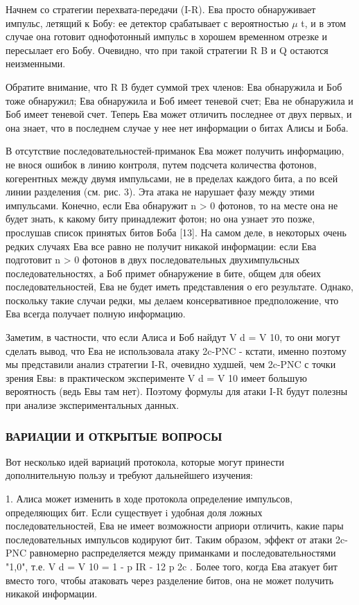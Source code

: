 Начнем со стратегии перехвата-передачи (I-R). Ева просто обнаруживает импульс, летящий к Бобу: ее детектор срабатывает с вероятностью $\mu$ t, и в этом случае она готовит однофотонный импульс в хорошем временном отрезке и пересылает его Бобу. Очевидно, что при такой стратегии R B и Q остаются неизменными.

Обратите внимание, что R B будет суммой трех членов: Ева обнаружила и Боб тоже обнаружил; Ева обнаружила и Боб имеет теневой счет; Ева не обнаружила и Боб имеет теневой счет. Теперь Ева может отличить последнее от двух первых, и она знает, что в последнем случае у нее нет информации о битах Алисы и Боба.

В отсутствие последовательностей-приманок Ева может получить информацию, не внося ошибок в линию контроля, путем подсчета количества фотонов, когерентных между двумя импульсами, не в пределах каждого бита, а по всей линии разделения (см. рис. 3). Эта атака не нарушает фазу между этими импульсами. Конечно, если Ева обнаружит n > 0 фотонов, то на месте она не будет знать, к какому биту принадлежит фотон; но она узнает это позже, прослушав список принятых битов Боба [13]. На самом деле, в некоторых очень редких случаях Ева все равно не получит никакой информации: если Ева подготовит n > 0 фотонов в двух последовательных двухимпульсных последовательностях, а Боб примет обнаружение в бите, общем для обеих последовательностей, Ева не будет иметь представления о его результате. Однако, поскольку такие случаи редки, мы делаем консервативное предположение, что Ева всегда получает полную информацию.

Заметим, в частности, что если Алиса и Боб найдут V d = V 10, то они могут сделать вывод, что Ева не использовала атаку 2c-PNC - кстати, именно поэтому мы представили анализ стратегии I-R, очевидно худшей, чем 2c-PNC с точки зрения Евы: в практическом эксперименте V d = V 10 имеет большую вероятность (ведь Евы там нет). Поэтому формулы для атаки I-R будут полезны при анализе экспериментальных данных.

\subsubsection{ВАРИАЦИИ И ОТКРЫТЫЕ ВОПРОСЫ}

Вот несколько идей вариаций протокола, которые могут принести дополнительную пользу и требуют дальнейшего изучения:

1. Алиса может изменить в ходе протокола определение импульсов, определяющих бит. Если существует i удобная доля ложных последовательностей, Ева не имеет возможности априори отличить, какие пары последовательных импульсов кодируют бит. Таким образом, эффект от атаки 2c-PNC равномерно распределяется между приманками и последовательностями "1,0", т.е. V d = V 10 = 1 - p IR - 12 p 2c . Более того, когда Ева атакует бит вместо того, чтобы атаковать через разделение битов, она не может получить никакой информации.

